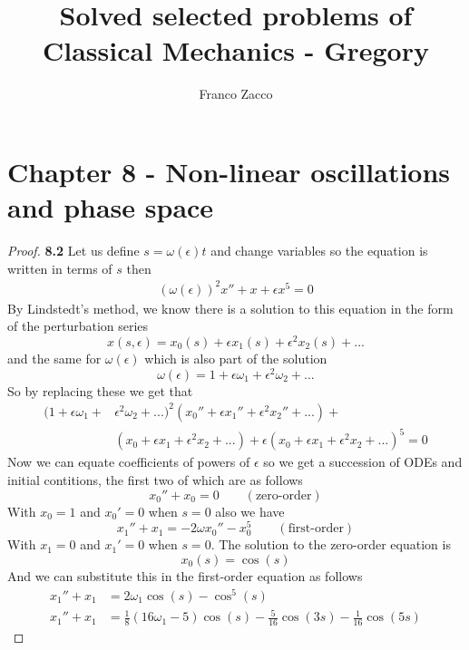 \documentclass[11pt]{article}
\title{\textbf{Solved selected problems of Classical Mechanics - Gregory}}
\author{Franco Zacco}
\date{}
\theoremstyle{definition}
\begin{document}
\maketitle
\thispagestyle{empty}

\section*{Chapter 8 - Non-linear oscillations and phase space}

	\begin{proof}{\textbf{8.2}}
        Let us define $s = \omega(\epsilon) t$ and change variables so
        the equation is written in terms of $s$ then
        \begin{align*}
            (\omega(\epsilon))^2 x'' + x + \epsilon x^5 = 0
        \end{align*}
        By Lindstedt's method, we know there is a solution to this equation
        in the form of the perturbation series
        $$x(s,\epsilon) = x_0(s) + \epsilon x_1(s) + \epsilon^2 x_2(s) + ...$$
        and the same for $\omega(\epsilon)$ which is also part of the solution
        $$\omega(\epsilon) = 1 + \epsilon\omega_1 + \epsilon^2\omega_2 + ...$$
        So by replacing these we get that
        \begin{align*}
            (1 + \epsilon\omega_1 + &\epsilon^2\omega_2 + ...)^2
            (x_0'' + \epsilon x_1'' + \epsilon^2 x_2'' + ...) +\\
            &(x_0 + \epsilon x_1 + \epsilon^2 x_2 + ...) +
            \epsilon(x_0 + \epsilon x_1 + \epsilon^2 x_2 + ...)^5 = 0
        \end{align*}
        Now we can equate coefficients of powers of $\epsilon$ so
        we get a succession of ODEs and initial contitions, the first two of
        which are as follows
        $$x_0'' + x_0 = 0\quad\quad (\text{zero-order})$$
        With $x_0 = 1$ and $x_0' = 0$ when $s = 0$ also we have
        $$x_1'' + x_1 = -2\omega x_0'' - x_0^5 \quad\quad (\text{first-order})$$
        With $x_1 = 0$ and $x_1' = 0$ when $s = 0$. The solution to the
        zero-order equation is
        $$x_0(s) = \cos(s)$$
        And we can substitute this in the first-order equation as follows
        \begin{align*}
            x_1'' + x_1 &= 2\omega_1 \cos(s) - \cos^5(s)\\
            x_1'' + x_1 &= \frac{1}{8}(16\omega_1 - 5)\cos(s) - \frac{5}{16}\cos(3s) - \frac{1}{16}\cos(5s)
        \end{align*}

\end{proof}
\end{document}
